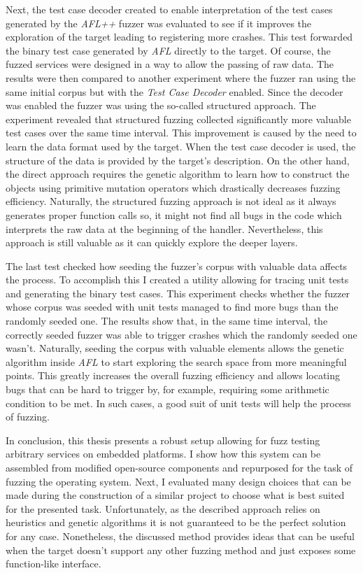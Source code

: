 Next, the test case decoder created to enable interpretation of the test cases generated by the \textit{AFL++} fuzzer was evaluated to see if it improves the exploration of the target leading to registering more crashes. This test forwarded the binary test case generated by \textit{AFL} directly to the target. Of course, the fuzzed services were designed in a way to allow the passing of raw data. The results were then compared to another experiment where the fuzzer ran using the same initial corpus but with the \textit{Test Case Decoder} enabled. Since the decoder was enabled the fuzzer was using the so-called structured approach. The experiment revealed that structured fuzzing collected significantly more valuable test cases over the same time interval. This improvement is caused by the need to learn the data format used by the target. When the test case decoder is used, the structure of the data is provided by the target's description. On the other hand, the direct approach requires the genetic algorithm to learn how to construct the objects using primitive mutation operators which drastically decreases fuzzing efficiency. Naturally, the structured fuzzing approach is not ideal as it always generates proper function calls so, it might not find all bugs in the code which interprets the raw data at the beginning of the handler. Nevertheless, this approach is still valuable as it can quickly explore the deeper layers.

The last test checked how seeding the fuzzer's corpus with valuable data affects the process. To accomplish this I created a utility allowing for tracing unit tests and generating the binary test cases. This experiment checks whether the fuzzer whose corpus was seeded with unit tests managed to find more bugs than the randomly seeded one. The results show that, in the same time interval, the correctly seeded fuzzer was able to trigger crashes which the randomly seeded one wasn't. Naturally, seeding the corpus with valuable elements allows the genetic algorithm inside \textit{AFL} to start exploring the search space from more meaningful points. This greatly increases the overall fuzzing efficiency and allows locating bugs that can be hard to trigger by, for example, requiring some arithmetic condition to be met. In such cases, a good suit of unit tests will help the process of fuzzing.

In conclusion, this thesis presents a robust setup allowing for fuzz testing arbitrary services on embedded platforms. I show how this system can be assembled from modified open-source components and repurposed for the task of fuzzing the operating system. Next, I evaluated many design choices that can be made during the construction of a similar project to choose what is best suited for the presented task. Unfortunately, as the described approach relies on heuristics and genetic algorithms it is not guaranteed to be the perfect solution for any case. Nonetheless, the discussed method provides ideas that can be useful when the target doesn't support any other fuzzing method and just exposes some function-like interface.
